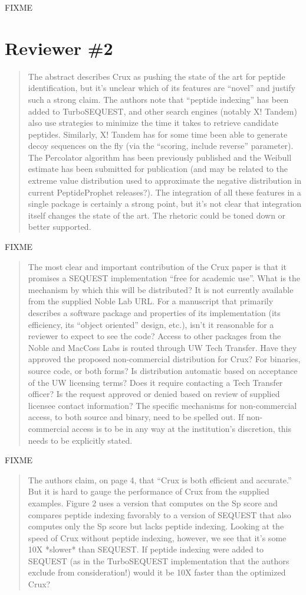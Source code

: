 \documentclass{article}
\newcommand{\breview}{\begin{quotation}\begin{em}\noindent}
\newcommand{\ereview}{\end{em}\end{quotation}}
\begin{document}
FIXME

\section*{Reviewer \#2}

\breview The abstract describes Crux as pushing the state of the art
for peptide identification, but it's unclear which of its features are
``novel'' and justify such a strong claim. The authors note that
``peptide indexing'' has been added to TurboSEQUEST, and other search
engines (notably X! Tandem) also use strategies to minimize the time
it takes to retrieve candidate peptides. Similarly, X! Tandem has for
some time been able to generate decoy sequences on the fly (via the
``scoring, include reverse'' parameter). The Percolator algorithm has
been previously published and the Weibull estimate has been submitted
for publication (and may be related to the extreme value distribution
used to approximate the negative distribution in current
PeptideProphet releases?). The integration of all these features in a
single package is certainly a strong point, but it's not clear that
integration itself changes the state of the art. The rhetoric could be
toned down or better supported. \ereview

FIXME

\breview The most clear and important contribution of the Crux paper
is that it promises a SEQUEST implementation ``free for academic
use''. What is the mechanism by which this will be distributed? It is
not currently available from the supplied Noble Lab URL. For a
manuscript that primarily describes a software package and properties
of its implementation (its efficiency, its ``object oriented'' design,
etc.), isn't it reasonable for a reviewer to expect to see the code?
Access to other packages from the Noble and MacCoss Labs is routed
through UW Tech Transfer. Have they approved the proposed
non-commercial distribution for Crux? For binaries, source code, or
both forms? Is distribution automatic based on acceptance of the UW
licensing terms? Does it require contacting a Tech Transfer officer?
Is the request approved or denied based on review of supplied licensee
contact information? The specific mechanisms for non-commercial
access, to both source and binary, need to be spelled out. If
non-commercial access is to be in any way at the institution's
discretion, this needs to be explicitly stated. \ereview

FIXME

\breview The authors claim, on page 4, that ``Crux is both efficient
and accurate.'' But it is hard to gauge the performance of Crux from
the supplied examples. Figure 2 uses a version that computes on the Sp
score and compares peptide indexing favorably to a version of SEQUEST
that also computes only the Sp score but lacks peptide
indexing. Looking at the speed of Crux without peptide indexing,
however, we see that it's some 10X *slower* than SEQUEST. If peptide
indexing were added to SEQUEST (as in the TurboSEQUEST implementation
that the authors exclude from consideration!) would it be 10X faster
than the optimized Crux? \ereview
\end{document}
